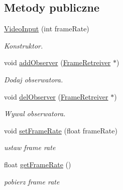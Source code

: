 \subsection*{Metody publiczne}
\begin{CompactItemize}
\item 
\hyperlink{class_video_input_136409a2c510d131dd25b00796ebb9a6}{VideoInput} (int frameRate)
\begin{CompactList}\small\item\em Konstruktor. \item\end{CompactList}\item 
void \hyperlink{class_video_input_c2370a0c1ea0d4b1ce36c2f9678530a4}{addObserver} (\hyperlink{class_frame_retreiver}{FrameRetreiver} $\ast$)
\begin{CompactList}\small\item\em Dodaj obserwatora. \item\end{CompactList}\item 
\hypertarget{class_video_input_fc3bab19893d3e49284ab8b8101b9d1f}{
void \hyperlink{class_video_input_fc3bab19893d3e49284ab8b8101b9d1f}{delObserver} (\hyperlink{class_frame_retreiver}{FrameRetreiver} $\ast$)}
\label{class_video_input_fc3bab19893d3e49284ab8b8101b9d1f}

\begin{CompactList}\small\item\em Wywal obserwatora. \item\end{CompactList}\item 
\hypertarget{class_video_input_498cc39dce8940616e9d1811953bf920}{
void \hyperlink{class_video_input_498cc39dce8940616e9d1811953bf920}{setFrameRate} (float frameRate)}
\label{class_video_input_498cc39dce8940616e9d1811953bf920}

\begin{CompactList}\small\item\em ustaw frame rate \item\end{CompactList}\item 
\hypertarget{class_video_input_a172de34ebd4e1f1e7c63548fb406f39}{
float \hyperlink{class_video_input_a172de34ebd4e1f1e7c63548fb406f39}{getFrameRate} ()}
\label{class_video_input_a172de34ebd4e1f1e7c63548fb406f39}

\begin{CompactList}\small\item\em pobierz frame rate \item\end{CompactList}\end{CompactItemize}
